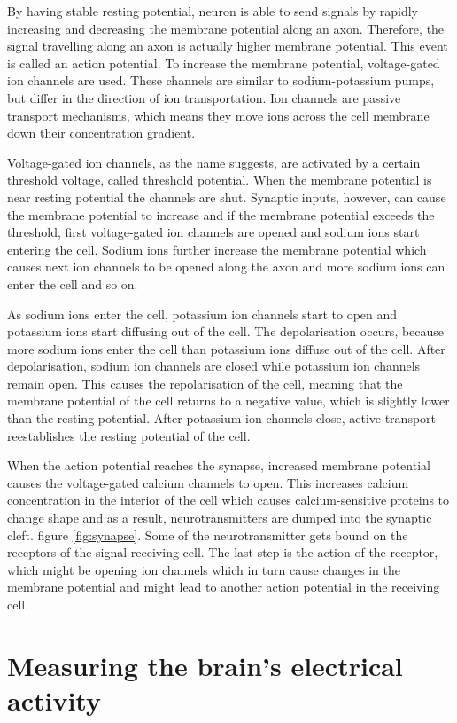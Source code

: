 By having stable resting potential, neuron is able to send signals by rapidly increasing and decreasing the membrane potential along an axon. Therefore, the signal travelling along an axon is actually higher membrane potential. This event is called an action potential. To increase the membrane potential, voltage-gated ion channels are used. These channels are similar to sodium-potassium pumps, but differ in the direction of ion transportation. Ion channels are passive transport mechanisms, which means they move ions across the cell membrane down their concentration gradient.

Voltage-gated ion channels, as the name suggests, are activated by a certain threshold voltage, called threshold potential. When the membrane potential is near resting potential the channels are shut. Synaptic inputs, however, can cause the membrane potential to increase and if the membrane potential exceeds the threshold, first voltage-gated ion channels are opened and sodium ions start entering the cell. Sodium ions further increase the membrane potential which causes next ion channels to be opened along the axon and more sodium ions can enter the cell and so on.

As sodium ions enter the cell, potassium ion channels start to open and potassium ions start diffusing out of the cell. The depolarisation occurs, because more sodium ions enter the cell than potassium ions diffuse out of the cell. After depolarisation, sodium ion channels are closed while potassium ion channels remain open. This causes the repolarisation of the cell, meaning that the membrane potential of the cell returns to a negative value, which is slightly lower than the resting potential. After potassium ion channels close, active transport reestablishes the resting potential of the cell.

When the action potential reaches the synapse, increased membrane potential causes the voltage-gated calcium channels to open. This increases calcium concentration in the interior of the cell which causes calcium-sensitive proteins to change shape and as a result, neurotransmitters are dumped into the synaptic cleft. figure \ref{fig:synapse}. Some of the neurotransmitter gets bound on the receptors of the signal receiving cell. The last step is the action of the receptor, which might be opening ion channels which in turn cause changes in the membrane potential and might lead to another action potential in the receiving cell.
 
\section{Measuring the brain's electrical activity}

